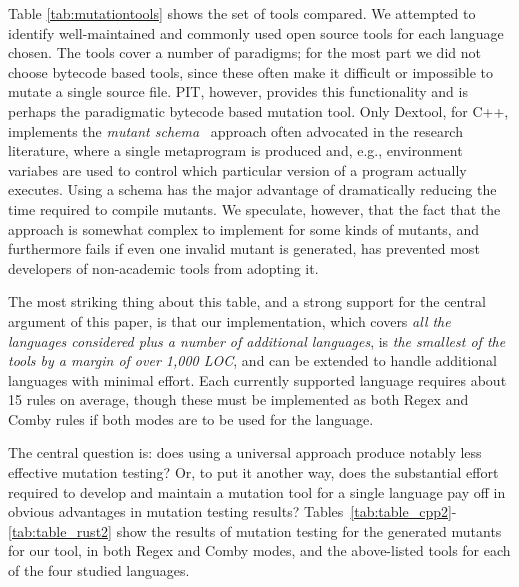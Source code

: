 \documentclass[acmsmall,screen,review,anonymous]{acmart}
\begin{document}
{    
Table \ref{tab:mutationtools} shows the set of tools compared.  We
attempted to identify well-maintained and commonly used open
source tools for each
language chosen.  The tools cover a number of paradigms; for the most
part we did not choose bytecode based tools, since these often make it
difficult or impossible to mutate a single source file.  PIT, however,
provides this functionality and is perhaps the paradigmatic bytecode
based mutation tool.  Only Dextool, for C++, implements the
\emph{mutant schema}~\cite{untch1993mutation} approach often advocated
in the research literature, where a single metaprogram is produced
and, e.g., environment variabes are used to control which particular
version of a program actually executes.  Using a schema has the major
advantage of dramatically reducing the time required to compile
mutants.  We speculate, however, that the fact that the approach is
somewhat complex to implement for some kinds of mutants, and
furthermore fails if even one invalid mutant is generated, has
prevented most developers of non-academic tools from adopting it.

The most striking thing about this table, and a strong support for
the central argument of this paper, is that our implementation, which
covers \emph{all the languages considered plus a number of additional
languages}, is \emph{the smallest of the tools by a margin of over 1,000 LOC},
and can be extended to handle additional languages with minimal
effort.  Each currently supported language requires about 15 rules on
average, though these must be implemented as both Regex and Comby
rules if both modes are to be used for the language.

The central question is: does using a universal approach produce
notably less effective mutation testing?  Or, to put it another way,
does the substantial effort required to develop and maintain a
mutation tool for a single language pay off in obvious advantages in
mutation testing results?
Tables~\ref{tab:table_cpp2}-\ref{tab:table_rust2} show the results of
mutation testing for the generated mutants for our tool, in both Regex
and Comby modes, and the above-listed tools for each of the four
studied languages.

}
\end{document}
